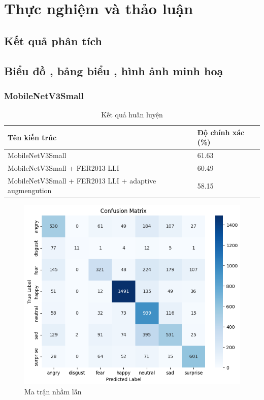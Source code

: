 \section{Thực nghiệm và thảo luận} %

\subsection{Kết quả phân tích}

\subsection{Biểu đồ , bảng biểu , hình ảnh minh hoạ}

\subsubsection{MobileNetV3Small}

\begin{table}[H]
\centering
\begin{tabular}{|l|l|}
\hline
\textbf{Tên kiến trúc} & \textbf{Độ chính xác (\%)} \\
\hline
MobileNetV3Small & 61.63 \\
MobileNetV3Small +  FER2013 LLI & 60.49 \\
MobileNetV3Small +  FER2013 LLI +  adaptive augmengution & 58.15 \\
\hline
\end{tabular}
\caption{Kết quả huấn luyện}
\end{table}
    
\begin{figure}[H]
\centering
\includegraphics[width=1\textwidth]{img/confusionMatrixMobilenetV3.png}  %
\caption{Ma trận nhầm lẫn}
\end{figure}

